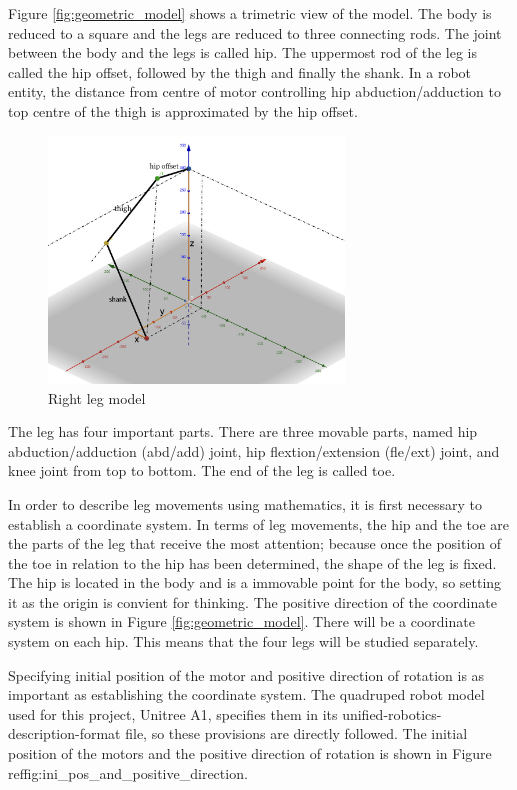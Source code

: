 Figure \ref{fig:geometric_model} shows a trimetric view of the model. The body is reduced to a square and the legs are reduced to three connecting rods. The joint between the body and the legs is called hip. The uppermost rod of the leg is called the hip offset, followed by the thigh and finally the shank. In a robot entity, the distance from centre of motor controlling hip abduction/adduction to top centre of the thigh is approximated by the hip offset.

\begin{figure}[htbp]
   \centering
   \includegraphics[width=0.7\textwidth]{figures/right_leg_model.jpg}
   \caption{Right leg model}
   \label{fig:right_leg_model}
\end{figure}

The leg has four important parts. There are three movable parts, named hip abduction/adduction (abd/add) joint, hip flextion/extension (fle/ext) joint, and knee joint from top to bottom. The end of the leg is called toe.

In order to describe leg movements using mathematics, it is first necessary to establish a coordinate system. In terms of leg movements, the hip and the toe are the parts of the leg that receive the most attention; because once the position of the toe in relation to the hip has been determined, the shape of the leg is fixed. The hip is located in the body and is a immovable point for the body, so setting it as the origin is convient for thinking. The positive direction of the coordinate system is shown in Figure \ref{fig:geometric_model}. There will be a coordinate system on each hip. This means that the four legs will be studied separately.

Specifying initial position of the motor and positive direction of rotation is as important as establishing the coordinate system. The quadruped robot model used for this project, Unitree A1, specifies them in its unified-robotics-description-format file, so these provisions are directly followed. The initial position of the motors and the positive direction of rotation is shown in Figure ref{fig:ini_pos_and_positive_direction}.

